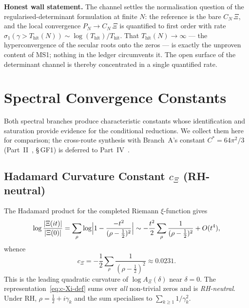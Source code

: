 \documentclass[12pt,a4paper]{article}
\theoremstyle{definition}
\theoremstyle{remark}
\begin{document}
\noindent\textbf{Honest wall statement.} The channel settles the
normalisation question of the regularised-determinant formulation at
finite $N$: the reference is the bare $C_N\,\Xi$, and the local
convergence $P_N \to C_N\,\Xi$ is quantified to first order with rate
$\sigma_1(\gamma > T_{\mathrm{hit}}(N)) \sim \log(T_{\mathrm{hit}})/
T_{\mathrm{hit}}$. That $T_{\mathrm{hit}}(N)\to\infty$ --- the
hyperconvergence of the secular roots onto the zeros --- is exactly the
unproven content of MS1; nothing in the ledger circumvents it. The open
surface of the determinant channel is thereby concentrated in a single
quantified rate.


\section{Spectral Convergence Constants}
\label{sec:spectral-constants}

Both spectral branches produce characteristic constants whose
identification and saturation provide evidence for the conditional
reductions. We collect them here for comparison; the cross-route
synthesis with Branch~A's constant $C^* = 64\pi^2/3$
(Part~II~\cite{Geiger2026partII}, \S\,GF1) is deferred to
Part~IV~\cite{Geiger2026partIV}.

\subsection{\texorpdfstring{Hadamard Curvature Constant $c_\Xi$ (RH-neutral)}{Hadamard Curvature Constant cXi (RH-neutral)}}

The Hadamard product for the completed Riemann
$\xi$-function gives
\[
  \log\frac{|\Xi(it)|}{|\Xi(0)|}
  = \sum_\rho \log\Bigl|1 - \frac{-t^2}{(\rho-\tfrac{1}{2})^2}\Bigr|
  \sim -\frac{t^2}{2}\sum_\rho
       \frac{1}{(\rho-\tfrac{1}{2})^2}
  + O(t^4),
\]
whence
\begin{equation}\label{eq:c-Xi-def}
  c_\Xi = -\frac{1}{2}\sum_\rho
          \frac{1}{(\rho-\tfrac{1}{2})^2}
        \approx 0.0231.
\end{equation}
This is the leading quadratic curvature of $\log A_\Xi(\delta)$ near
$\delta = 0$. The representation~\eqref{eq:c-Xi-def} sums over \emph{all}
non-trivial zeros and is \emph{RH-neutral}. Under RH, $\rho =
\tfrac{1}{2}+i\gamma_k$ and the sum specialises to
$\sum_{k\geq 1} 1/\gamma_k^2$.
\end{document}
